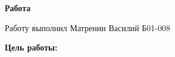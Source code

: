 

\shiftedText{0.5cm}{14cm}
{

    \begin{center}
    \vspace*{1.0cm}

        {\bf\huge Работа \labnum }

    \vspace*{0.2cm}

        {\bf\Large \labname }

    \vspace*{0.8cm}

        {\Large Работу выполнил Матренин Василий Б01-008 }

    \vspace*{1.6cm}

    \end{center}

    {\bf\noindent Цель работы: } \labobj

}

\newpage